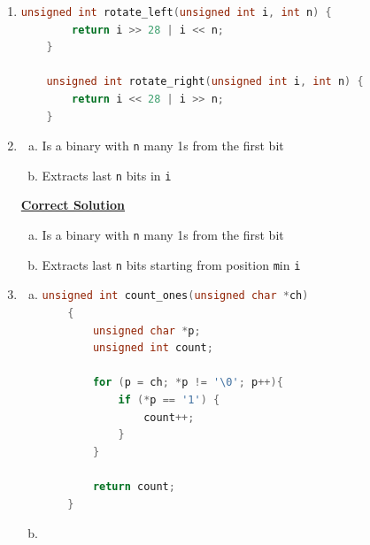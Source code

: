 \documentclass[12pt]{article}
\begin{document}
\begin{enumerate}[1.]
    \item

\begin{lstlisting}[language=c]
    unsigned int rotate_left(unsigned int i, int n) {
        return i >> 28 | i << n;
    }

    unsigned int rotate_right(unsigned int i, int n) {
        return i << 28 | i >> n;
    }
\end{lstlisting}

    \item

    \begin{enumerate}[a)]
        \item Is a binary with \texttt{n} many 1s from the first bit
        \item Extracts last \texttt{n} bits in \texttt{i}
    \end{enumerate}

    \bigskip

    \begin{mdframed}

    \underline{\textbf{Correct Solution}}

    \bigskip

    \begin{enumerate}[a)]
        \item Is a binary with \texttt{n} many 1s from the first bit
        \item Extracts last \texttt{n} bits \color{red}starting from position \texttt{m}\color{black}\:in \texttt{i}
    \end{enumerate}

    \end{mdframed}

    \item

    \begin{enumerate}[a)]
        \item

\begin{lstlisting}[language=c]
    unsigned int count_ones(unsigned char *ch)
    {
        unsigned char *p;
        unsigned int count;

        for (p = ch; *p != '\0'; p++){
            if (*p == '1') {
                count++;
            }
        }

        return count;
    }
\end{lstlisting}

        \item


\end{enumerate}
\end{enumerate}
\end{document}
